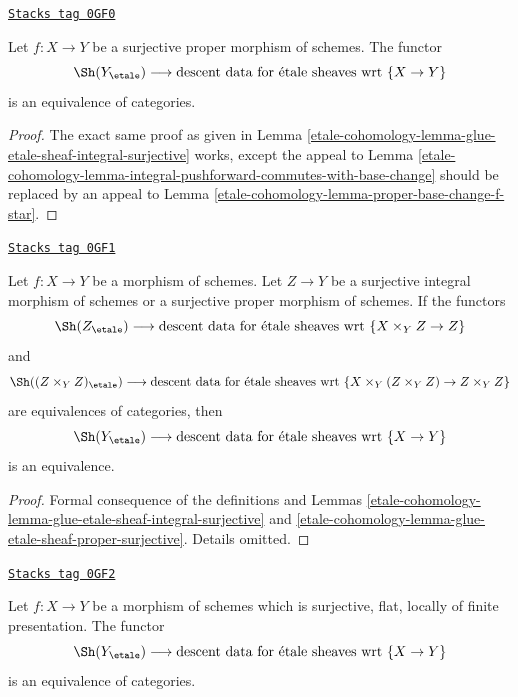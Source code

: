 \begin{lemma}
\label{etale-cohomology-lemma-glue-etale-sheaf-proper-surjective}
\href{https://stacks.math.columbia.edu/tag/0GF0}{\texttt{Stacks tag 0GF0}}

Let $f : X \to Y$ be a surjective proper morphism of schemes.
The functor
$$
\Sh(Y_\etale)
\longrightarrow
\text{descent data for \'etale sheaves wrt }\{X \to Y\}
$$
is an equivalence of categories.
\end{lemma}

\begin{proof}
The exact same proof as given in
Lemma \ref{etale-cohomology-lemma-glue-etale-sheaf-integral-surjective}
works, except the appeal to
Lemma \ref{etale-cohomology-lemma-integral-pushforward-commutes-with-base-change}
should be replaced by an appeal to
Lemma \ref{etale-cohomology-lemma-proper-base-change-f-star}.
\end{proof}

\begin{lemma}
\label{etale-cohomology-lemma-glue-etale-sheaf-check-after-base-change}
\href{https://stacks.math.columbia.edu/tag/0GF1}{\texttt{Stacks tag 0GF1}}

Let $f : X \to Y$ be a morphism of schemes. Let $Z \to Y$ be a surjective
integral morphism of schemes or a surjective proper morphism of schemes.
If the functors
$$
\Sh(Z_\etale)
\longrightarrow
\text{descent data for \'etale sheaves wrt }\{X \times_Y Z \to Z\}
$$
and
$$
\Sh((Z \times_Y Z)_\etale)
\longrightarrow
\text{descent data for \'etale sheaves wrt }
\{X \times_Y (Z \times_Y Z) \to Z \times_Y Z\}
$$
are equivalences of categories, then
$$
\Sh(Y_\etale)
\longrightarrow
\text{descent data for \'etale sheaves wrt }\{X \to Y\}
$$
is an equivalence.
\end{lemma}

\begin{proof}
Formal consequence of the definitions and
Lemmas \ref{etale-cohomology-lemma-glue-etale-sheaf-integral-surjective} and
\ref{etale-cohomology-lemma-glue-etale-sheaf-proper-surjective}. Details omitted.
\end{proof}

\begin{lemma}
\label{etale-cohomology-lemma-glue-etale-sheaf-fppf-cover}
\href{https://stacks.math.columbia.edu/tag/0GF2}{\texttt{Stacks tag 0GF2}}

Let $f : X \to Y$ be a morphism of schemes which is
surjective, flat, locally of finite presentation.
The functor
$$
\Sh(Y_\etale)
\longrightarrow
\text{descent data for \'etale sheaves wrt }\{X \to Y\}
$$
is an equivalence of categories.
\end{lemma}

